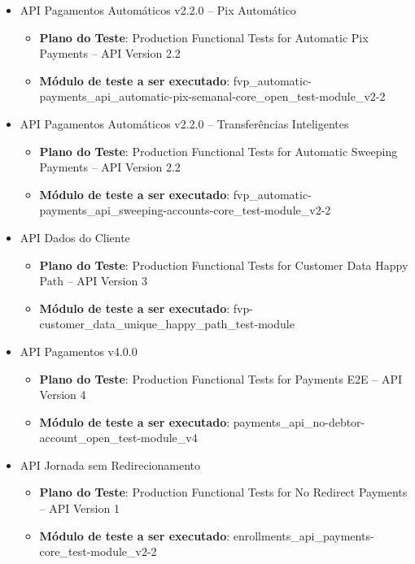 \begin{itemize}
    \item API Pagamentos Automáticos v2.2.0 – Pix Automático
    \begin{itemize}
        \item \textbf{Plano do Teste}: Production Functional Tests for Automatic Pix Payments – API Version 2.2
        \item \textbf{Módulo de teste a ser executado}: fvp\_automatic-payments\_api\_automatic-pix-semanal-core\_open\_test-module\_v2-2
    \end{itemize}
    
    \item API Pagamentos Automáticos v2.2.0 – Transferências Inteligentes
    \begin{itemize}
        \item \textbf{Plano do Teste}: Production Functional Tests for Automatic Sweeping Payments – API Version 2.2
        \item \textbf{Módulo de teste a ser executado}: fvp\_automatic-payments\_api\_sweeping-accounts-core\_test-module\_v2-2
    \end{itemize}
    
    \item API Dados do Cliente
    \begin{itemize}
        \item \textbf{Plano do Teste}: Production Functional Tests for Customer Data Happy Path – API Version 3
        \item \textbf{Módulo de teste a ser executado}: fvp-customer\_data\_unique\_happy\_path\_test-module
    \end{itemize}
    
    \item API Pagamentos v4.0.0
    \begin{itemize}
        \item \textbf{Plano do Teste}: Production Functional Tests for Payments E2E – API Version 4
        \item \textbf{Módulo de teste a ser executado}: payments\_api\_no-debtor-account\_open\_test-module\_v4
    \end{itemize}
    
    \item API Jornada sem Redirecionamento
    \begin{itemize}
        \item \textbf{Plano do Teste}: Production Functional Tests for No Redirect Payments – API Version 1
        \item \textbf{Módulo de teste a ser executado}: enrollments\_api\_payments-core\_test-module\_v2-2
    \end{itemize}
    

\end{itemize}
